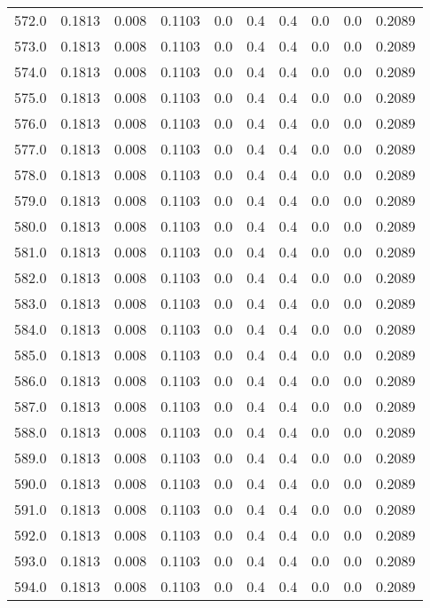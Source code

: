 \begin{longtable}{lrrrrrrrrr}
572.0 & 0.1813 & 0.008 & 0.1103 & 0.0 & 0.4 & 0.4 & 0.0 & 0.0 & 0.2089 \\
573.0 & 0.1813 & 0.008 & 0.1103 & 0.0 & 0.4 & 0.4 & 0.0 & 0.0 & 0.2089 \\
574.0 & 0.1813 & 0.008 & 0.1103 & 0.0 & 0.4 & 0.4 & 0.0 & 0.0 & 0.2089 \\
575.0 & 0.1813 & 0.008 & 0.1103 & 0.0 & 0.4 & 0.4 & 0.0 & 0.0 & 0.2089 \\
576.0 & 0.1813 & 0.008 & 0.1103 & 0.0 & 0.4 & 0.4 & 0.0 & 0.0 & 0.2089 \\
577.0 & 0.1813 & 0.008 & 0.1103 & 0.0 & 0.4 & 0.4 & 0.0 & 0.0 & 0.2089 \\
578.0 & 0.1813 & 0.008 & 0.1103 & 0.0 & 0.4 & 0.4 & 0.0 & 0.0 & 0.2089 \\
579.0 & 0.1813 & 0.008 & 0.1103 & 0.0 & 0.4 & 0.4 & 0.0 & 0.0 & 0.2089 \\
580.0 & 0.1813 & 0.008 & 0.1103 & 0.0 & 0.4 & 0.4 & 0.0 & 0.0 & 0.2089 \\
581.0 & 0.1813 & 0.008 & 0.1103 & 0.0 & 0.4 & 0.4 & 0.0 & 0.0 & 0.2089 \\
582.0 & 0.1813 & 0.008 & 0.1103 & 0.0 & 0.4 & 0.4 & 0.0 & 0.0 & 0.2089 \\
583.0 & 0.1813 & 0.008 & 0.1103 & 0.0 & 0.4 & 0.4 & 0.0 & 0.0 & 0.2089 \\
584.0 & 0.1813 & 0.008 & 0.1103 & 0.0 & 0.4 & 0.4 & 0.0 & 0.0 & 0.2089 \\
585.0 & 0.1813 & 0.008 & 0.1103 & 0.0 & 0.4 & 0.4 & 0.0 & 0.0 & 0.2089 \\
586.0 & 0.1813 & 0.008 & 0.1103 & 0.0 & 0.4 & 0.4 & 0.0 & 0.0 & 0.2089 \\
587.0 & 0.1813 & 0.008 & 0.1103 & 0.0 & 0.4 & 0.4 & 0.0 & 0.0 & 0.2089 \\
588.0 & 0.1813 & 0.008 & 0.1103 & 0.0 & 0.4 & 0.4 & 0.0 & 0.0 & 0.2089 \\
589.0 & 0.1813 & 0.008 & 0.1103 & 0.0 & 0.4 & 0.4 & 0.0 & 0.0 & 0.2089 \\
590.0 & 0.1813 & 0.008 & 0.1103 & 0.0 & 0.4 & 0.4 & 0.0 & 0.0 & 0.2089 \\
591.0 & 0.1813 & 0.008 & 0.1103 & 0.0 & 0.4 & 0.4 & 0.0 & 0.0 & 0.2089 \\
592.0 & 0.1813 & 0.008 & 0.1103 & 0.0 & 0.4 & 0.4 & 0.0 & 0.0 & 0.2089 \\
593.0 & 0.1813 & 0.008 & 0.1103 & 0.0 & 0.4 & 0.4 & 0.0 & 0.0 & 0.2089 \\
594.0 & 0.1813 & 0.008 & 0.1103 & 0.0 & 0.4 & 0.4 & 0.0 & 0.0 & 0.2089 \\

\end{longtable}
